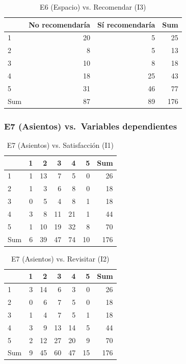 \documentclass[
  spanish,
]{article}
\begin{document}
\begin{longtable}[t]{lrrr}
\caption{\label{tab:cont-e6-recom}E6 (Espacio) vs. Recomendar (I3)}\\
\toprule
 & No recomendaría & Sí recomendaría & Sum\\
\midrule
1 & 20 & 5 & 25\\
2 & 8 & 5 & 13\\
3 & 10 & 8 & 18\\
4 & 18 & 25 & 43\\
5 & 31 & 46 & 77\\
\addlinespace
Sum & 87 & 89 & 176\\
\bottomrule
\end{longtable}

\subsubsection{E7 (Asientos) vs.~Variables
dependientes}\label{e7-asientos-vs.-variables-dependientes}

\begin{longtable}[t]{lrrrrrr}
\caption{\label{tab:cont-e7-satisf}E7 (Asientos) vs. Satisfacción (I1)}\\
\toprule
 & 1 & 2 & 3 & 4 & 5 & Sum\\
\midrule
1 & 1 & 13 & 7 & 5 & 0 & 26\\
2 & 1 & 3 & 6 & 8 & 0 & 18\\
3 & 0 & 5 & 4 & 8 & 1 & 18\\
4 & 3 & 8 & 11 & 21 & 1 & 44\\
5 & 1 & 10 & 19 & 32 & 8 & 70\\
\addlinespace
Sum & 6 & 39 & 47 & 74 & 10 & 176\\
\bottomrule
\end{longtable}

\begin{longtable}[t]{lrrrrrr}
\caption{\label{tab:cont-e7-revis}E7 (Asientos) vs. Revisitar (I2)}\\
\toprule
 & 1 & 2 & 3 & 4 & 5 & Sum\\
\midrule
1 & 3 & 14 & 6 & 3 & 0 & 26\\
2 & 0 & 6 & 7 & 5 & 0 & 18\\
3 & 1 & 4 & 7 & 5 & 1 & 18\\
4 & 3 & 9 & 13 & 14 & 5 & 44\\
5 & 2 & 12 & 27 & 20 & 9 & 70\\
\addlinespace
Sum & 9 & 45 & 60 & 47 & 15 & 176\\
\bottomrule
\end{longtable}
\end{document}
